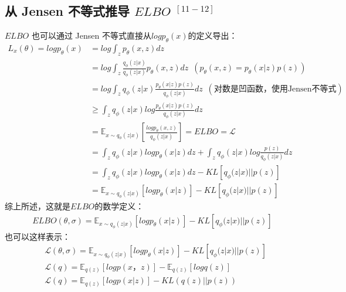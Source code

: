\documentclass[final]{ws-ijseke}
\begin{document}
\subsection{从 Jensen 不等式推导 $ELBO$ $^{[11-12]}$}
$ELBO$ 也可以通过 Jensen 不等式直接从$logp_\theta(x)$的定义导出：
\begin{align*}
    L_x(\theta) = logp_\theta(x) &= log\int_z p_\theta(x,z)dz \\ &= log\int_z \frac{q_\phi(z|x)}{q_\phi(z|x)}p_\theta(x,z)dz \,\,\, (p_\theta(x,z) = p_\theta(x|z)p(z))\\&= log \int_z q_\phi(z|x)\frac{p_\theta(x|z)p(z)}{q_\phi(z|x)}dz\,\,\, (\text{对数是凹函数，使用Jensen不等式})\\&\ge
    \int_z q_\phi(z|x)log\frac{p_\theta(x|z)p(z)}{q_\phi(z|x)}dz \\&=  \mathbb{E}_{x\sim q_\phi(z|x)}[\frac{logp_\theta(x,z)}{q_\phi(z|x)}]  =ELBO = \mathcal L\\&=
    \int_z q_\phi(z|x)logp_\theta(x|z)dz + \int_z q_\phi(z|x)log\frac{p(z)}{q_\phi(z|x)}dz \\&
    = \int_z q_\phi(z|x)logp_\theta(x|z)dz - KL[q_\phi(z|x)||p(z)]
    \\&= \mathbb{E}_{x\sim q_\phi(z|x)}[logp_\theta(x|z)] - KL[q_\phi(z|x)||p(z)]
\end{align*}
综上所述，这就是$ELBO$的数学定义：
\begin{align*}
ELBO(\theta,\sigma)= \mathbb{E}_{x\sim q_\phi(z|x)}[logp_\theta(x|z)] - KL[q_\phi(z|x)||p(z)]
\end{align*}
也可以这样表示：
\begin{align*}&
\mathcal L(\theta,\sigma)= \mathbb{E}_{x\sim q_\phi(z|x)}[logp_\theta(x|z)] - KL[q_\phi(z|x)||p(z)]\\&
\mathcal L(q) = \mathbb{E}_{q(z)}[logp(x，z)]-\mathbb{E}_{q(z)}[logq(z)]\\&
\mathcal L(q) = \mathbb{E}_{q(z)}[logp(x|z)]-KL(q(z)||p(z))
\end{align*}
\end{document}
